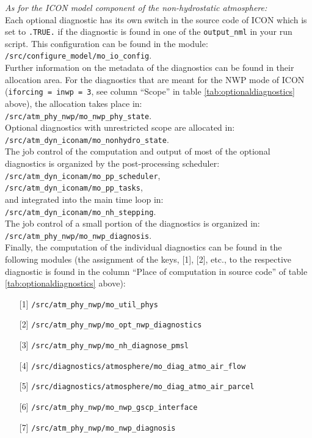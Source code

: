 \emph{As for the ICON model component of the non-hydrostatic atmosphere:}\\

Each optional diagnostic has its own switch in the source code of ICON 
which is set to \texttt{.TRUE.} if the diagnostic is found in one of the \texttt{output\_nml} in your run script. 
This configuration can be found in the module: \\
\texttt{/src/configure\_model/mo\_io\_config}. \\

Further information on the metadata of the diagnostics can be found 
in their allocation area. 
For the diagnostics that are meant for the NWP mode of ICON 
(\texttt{iforcing = inwp = 3}, see column ``Scope'' in table \ref{tab:optionaldiagnostics} above), 
the allocation takes place in:\\
\texttt{/src/atm\_phy\_nwp/mo\_nwp\_phy\_state}.\\
Optional diagnostics with unrestricted scope are allocated in:\\
\texttt{/src/atm\_dyn\_iconam/mo\_nonhydro\_state}.\\

The job control of the computation and output of most of the optional diagnostics 
is organized by the post-processing scheduler:\\
\texttt{/src/atm\_dyn\_iconam/mo\_pp\_scheduler}, \\
\texttt{/src/atm\_dyn\_iconam/mo\_pp\_tasks}, \\
and integrated into the main time loop in:\\
\texttt{/src/atm\_dyn\_iconam/mo\_nh\_stepping}.\\
The job control of a small portion of the diagnostics 
is organized in: \\
\texttt{/src/atm\_phy\_nwp/mo\_nwp\_diagnosis}.\\

Finally, the computation of the individual diagnostics can be found 
in the following modules 
(the assignment of the keys, {[1]}, {[2]}, etc., to the respective diagnostic 
is found in the column ``Place of computation in source code'' of table \ref{tab:optionaldiagnostics} above):
%
\begin{itemize}
\setlength\itemsep{-0.3em}
\item[{[1]}] \texttt{/src/atm\_phy\_nwp/mo\_util\_phys}
\item[{[2]}] \texttt{/src/atm\_phy\_nwp/mo\_opt\_nwp\_diagnostics}
\item[{[3]}] \texttt{/src/atm\_phy\_nwp/mo\_nh\_diagnose\_pmsl} 
\item[{[4]}] \texttt{/src/diagnostics/atmosphere/mo\_diag\_atmo\_air\_flow} 
\item[{[5]}] \texttt{/src/diagnostics/atmosphere/mo\_diag\_atmo\_air\_parcel}
\item[{[6]}] \texttt{/src/atm\_phy\_nwp/mo\_nwp\_gscp\_interface}
\item[{[7]}] \texttt{/src/atm\_phy\_nwp/mo\_nwp\_diagnosis}
\end{itemize}
%

